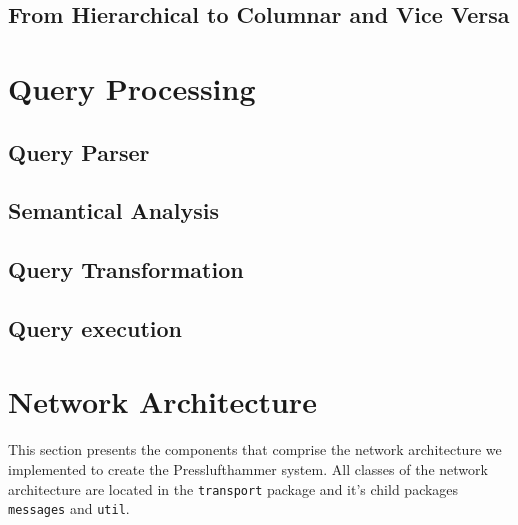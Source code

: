 \subsection{From Hierarchical to Columnar and Vice Versa}
\label{sec:transform}


\section{Query Processing}

\subsection{Query Parser}

\subsection{Semantical Analysis}

\subsection{Query Transformation}

\subsection{Query execution}


\section{Network Architecture}
  This section presents the components that comprise the network architecture
  we implemented to create the Presslufthammer system.
  All classes of the network architecture are located in the \texttt{transport}
  package and it's child packages \texttt{messages} and \texttt{util}.
  
  
